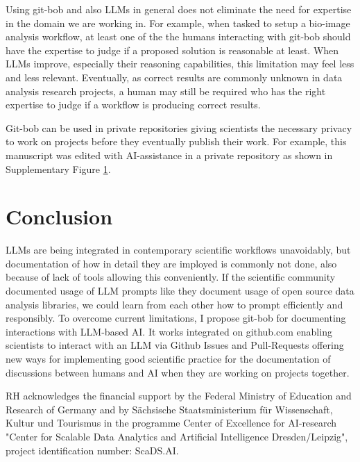 \documentclass{ecai}
\begin{document}
Using git-bob and also LLMs in general does not eliminate the need for expertise in the domain we are working in. For example, when tasked to setup a bio-image analysis workflow, at least one of the the humans interacting with git-bob should have the expertise to judge if a proposed solution is reasonable at least. When LLMs improve, especially their reasoning capabilities, this limitation may feel less and less relevant. Eventually, as correct results are commonly unknown in data analysis research projects, a human  may still be required who has the right expertise to judge if a workflow is producing correct results.

Git-bob can be used in private repositories giving scientists the necessary privacy to work on projects before they eventually publish their work. For example, this manuscript was edited with AI-assistance in a private repository as shown in Supplementary Figure \ref{}.


\section{Conclusion}

LLMs are being integrated in contemporary scientific workflows unavoidably, but documentation of how in detail they are imployed is commonly not done, also because of lack of tools allowing this conveniently. If the scientific community documented usage of LLM prompts like they document usage of open source data analysis libraries, we could learn from each other how to prompt efficiently and responsibly. To overcome current limitations, I propose git-bob for documenting interactions with LLM-based AI. It works integrated on github.com enabling scientists to interact with an LLM via Github Issues and Pull-Requests offering new ways for implementing good scientific practice for the documentation of discussions between humans and AI when they are working on projects together.



\begin{ack}
RH acknowledges the financial support by the Federal Ministry of Education and Research of Germany and by Sächsische Staatsministerium für Wissenschaft, Kultur und Tourismus in the programme Center of Excellence for AI-research "Center for Scalable Data Analytics and Artificial Intelligence Dresden/Leipzig", project identification number: ScaDS.AI.

\end{ack}
\end{document}
